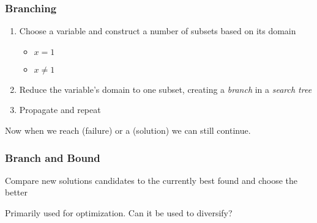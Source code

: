 \begin{frame}
	\frametitle{Branching}

	\begin{enumerate}
		\item Choose a variable and construct a number of subsets based on its domain
			\begin{itemize}
				\item $x = 1$
				\item $x \neq 1$
			\end{itemize}
		\item Reduce the variable's domain to one subset, creating a \textit{branch} in a \textit{search tree}
		\item Propagate and repeat
	\end{enumerate}

	\vspace{0.5cm}

	Now when we reach (failure) or a (solution) we can still continue.

\end{frame}

\begin{frame}
	\frametitle{Branch and Bound}

	Compare new solutions candidates to the currently best found and choose the better

	\vspace{0.5cm}

	Primarily used for optimization. Can it be used to diversify?

\end{frame}
